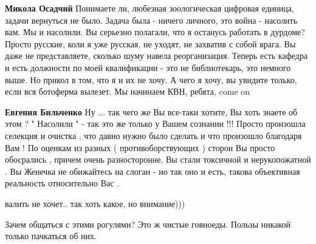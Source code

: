 \begin{itemize}
\begin{itemize}
 
\textbf{Микола Осадчий} Понимаете ли, любезная зоологическая цифровая единица,
задачи вернуться не было. Задача была - ничего личного, это война - насолить
вам. Мы и насолили. Вы серьезно полагали, что я останусь работать в дурдоме?
Просто русские, коли я уже русская, не уходят, не захватив с собой врага. Вы
даже не представляете, сколько шуму навела реорганизация. Теперь есть кафедра и
есть должности по моей квалификации - это не библиотекарь, это немного выше. Но
прикол в том, что я и их не хочу. А чего я хочу, вы увидите только, если вся
ботоферма вылезет. Мы начинаем КВН, ребята, come on

 
\textbf{Евгения Бильченко} Ну ... так чего же Вы все-таки хотите, Вы хоть
знаете об этом ? " Насолили " - так это же только у Вашем сознании !!! Просто
произошла селекция и очистка , что давно нужно было сделать и что произошло
благодаря Вам ! По оценкам из разных ( противоборствующих ) сторон Вы просто
обосрались , причем очень разносторонне. Вы стали токсичной и нерукопожатной .
Вы Женечка не обижайтесь на слоган - но так оно и есть, такова объективная
реальность относительно Вас .

\end{itemize}

 
валить не хочет.. так хоть какое, но внимание)))

 
Зачем общаться с этими рогулями? Это ж чистые говноеды. Пользы никакой только пачкаться об них.


\end{itemize}
